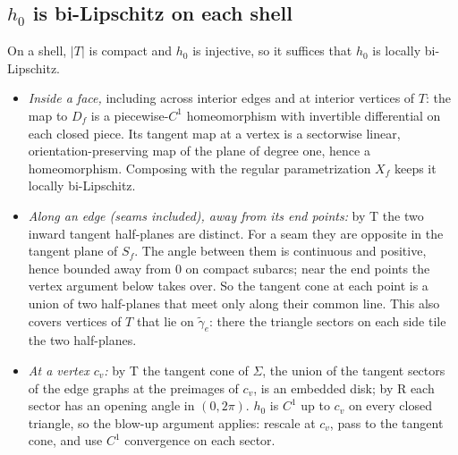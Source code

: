 \documentclass[preprint,12pt]{elsarticle}
\theoremstyle{definition}
\theoremstyle{remark}
\begin{document}
\subsection{$h_0$ is bi-Lipschitz on each shell}
On a shell, $|T|$ is compact and $h_0$ is injective, so it suffices that $h_0$ is locally bi-Lipschitz.
\begin{itemize}
\item \emph{Inside a face,} including across interior edges and at interior vertices of $T$: the map to $D_f$ is a
piecewise-$C^1$ homeomorphism with invertible differential on each closed piece. Its tangent map at a vertex is a
sectorwise linear, orientation-preserving map of the plane of degree one, hence a homeomorphism. Composing with the
regular parametrization $X_f$ keeps it locally bi-Lipschitz.
\item \emph{Along an edge (seams included), away from its end points:} by T the two inward tangent half-planes are
distinct. For a seam they are opposite in the tangent plane of $S_f$. The angle between them is continuous and
positive, hence bounded away from $0$ on compact subarcs; near the end points the vertex argument below takes over. So the tangent cone at
each point is a union of two half-planes that meet only along their common line. This also covers vertices of $T$ that
lie on $\tilde\gamma_e$: there the triangle sectors on each side tile the two half-planes.
\item \emph{At a vertex $c_v$:} by T the tangent cone of $\Sigma$, the union of the tangent sectors of the edge graphs at
the preimages of $c_v$, is an embedded disk; by R each sector has an opening angle in $(0,2\pi)$. $h_0$ is $C^1$ up to $c_v$ on every
closed triangle, so the blow-up argument applies: rescale at $c_v$, pass to the tangent cone, and use $C^1$ convergence
on each sector.
\end{itemize}
\end{document}
